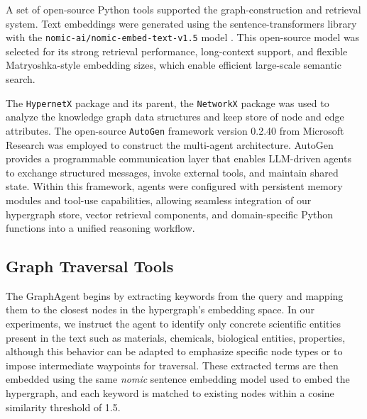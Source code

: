 \documentclass{article}
\begin{document}
A set of open-source Python tools supported the graph-construction and retrieval system. Text embeddings were generated using the sentence-transformers library \cite{reimers-2019-sentence-bert} with the \texttt{nomic-ai/nomic-embed-text-v1.5} model \cite{nussbaum2024nomic}. This open-source model was selected for its strong retrieval performance, long-context support, and flexible Matryoshka-style embedding sizes, which enable efficient large-scale semantic search. 

The \texttt{HypernetX} package \cite{praggastis2023hypernetxpythonpackagemodeling} and its parent, the \texttt{NetworkX} package \cite{SciPyProceedings_11} was used to analyze the knowledge graph data structures and keep store of node and edge attributes. The open-source \texttt{AutoGen} framework \cite{wu2023autogenenablingnextgenllm} version 0.2.40 from Microsoft Research was employed to construct the multi-agent architecture. AutoGen provides a programmable communication layer that enables LLM-driven agents to exchange structured messages, invoke external tools, and maintain shared state. Within this framework, agents were configured with persistent memory modules and tool-use capabilities, allowing seamless integration of our hypergraph store, vector retrieval components, and domain-specific Python functions into a unified reasoning workflow.


\subsection{Graph Traversal Tools}

The GraphAgent begins by extracting keywords from the query and mapping them to the closest nodes in the hypergraph’s embedding space. In our experiments, we instruct the agent to identify only concrete scientific entities present in the text such as materials, chemicals, biological entities, properties, although this behavior can be adapted to emphasize specific node types or to impose intermediate waypoints for traversal. These extracted terms are then embedded using the same \emph{nomic} sentence embedding model used to embed the hypergraph, and each keyword is matched to existing nodes within a cosine similarity threshold of 1.5.
\end{document}
